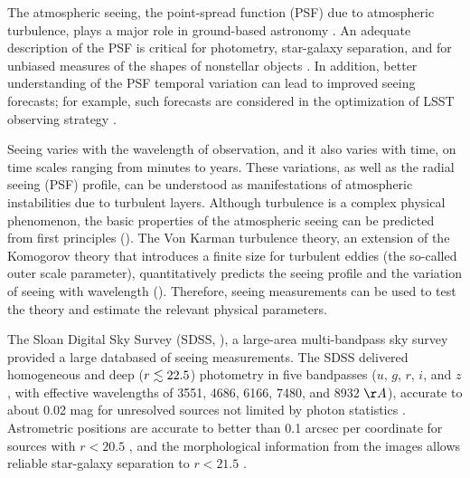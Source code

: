 

The atmospheric seeing, the point-spread function (PSF) due to atmospheric turbulence, plays
a major role in ground-based astronomy \cite{Roddier1981}. An adequate description 
of the PSF is critical for photometry, star-galaxy separation, and for unbiased measures of 
the shapes of nonstellar objects \citep{Lupton2001}. In addition, better understanding of the 
PSF temporal variation can lead to improved seeing forecasts; for example, such forecasts are 
considered in the optimization of LSST observing strategy \citep{LSSToverview}.

Seeing varies with the wavelength of observation, and it also varies with time, on time 
scales ranging from minutes to years. These variations, as well as the radial seeing (PSF) 
profile, can be understood as manifestations of atmospheric instabilities due to turbulent layers. 
Although turbulence is a complex physical phenomenon, the basic properties of the atmospheric
seeing can be predicted from first principles (\cite{Racine2009}). The Von Karman turbulence theory, 
an extension of the Komogorov theory that introduces a finite size for turbulent eddies (the so-called
outer scale parameter), quantitatively predicts the seeing profile and the variation of seeing
with wavelength (\cite{vk1, vk2}). Therefore, seeing measurements can be used to test the theory and estimate
the relevant physical parameters. 

The Sloan Digital Sky Survey (SDSS, \citealt{York2000}), a large-area multi-bandpass sky survey
provided a large databased of seeing measurements. The SDSS delivered homogeneous and deep 
($r\lesssim22.5$) photometry in five bandpasses ($u$, $g$, $r$, $i$, and $z$, with effective wavelengths 
of 3551, 4686, 6166, 7480, and 8932 $\AA$), accurate to about 0.02 mag for unresolved sources 
not limited by photon statistics \citep{Sesar2007}. Astrometric positions are accurate to better 
than 0.1 arcsec per coordinate for sources with $r<20.5$ \citep{Pier2003}, and the morphological 
information from the images allows reliable star-galaxy separation to $r<21.5$ \citep{Lupton2002}.
 
